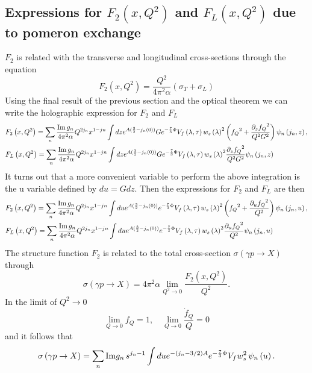 \documentclass[a4paper,12pt]{article}
\begin{document}
\subsection{Expressions for $F_2\left(x, Q^2\right)$ and $F_L\left(x, Q^2\right)$ due to pomeron exchange}
$F_2$ is related with the transverse and longitudinal cross-sections through the equation
\begin{equation}
 F_2\left(x, Q^2\right) = \frac{Q^2}{4 \pi^2 \alpha} \left( \sigma_T + \sigma_L \right)
\end{equation}
Using the final result of the previous section and the optical theorem we can write the holographic expression for $F_2$ and $F_L$
\begin{align}
 &F_2\left(x, Q^2\right) = \sum_n \frac{{\rm Im} \, g_n}{4 \pi^2 \alpha} Q^{2 j_n} x^{1-jn} \int dz e^{A(\frac{3}{2} - {j_n\left(0\right)})} G e^{-\frac{7}{3} \Phi}  V_f \left( \lambda, \tau \right) {w_s\left(\lambda \right)}^2  \left(  {f_Q}^2 + \frac{{\partial_z f_Q}^2}{Q^2 G^2}  \right) \psi_n \left(j_n, z\right), \\
& F_L\left(x, Q^2\right) = \sum_n \frac{{\rm Im} \,g_n}{4 \pi^2 \alpha} Q^{2 j_n} x^{1-jn} \int dz e^{A(\frac{3}{2} - {j_n\left(0\right)})} G e^{-\frac{7}{3} \Phi}  V_f \left( \lambda, \tau \right) {w_s\left(\lambda \right)}^2  \frac{{\partial_z f_Q}^2}{Q^2 G^2} \psi_n \left(j_n, z\right)
\end{align}
It turns out that a more convenient variable to perform the above integration is the u variable defined by $du = G dz$. Then the expressions for $F_2$ and $F_L$ are then
\begin{align}
 &F_2\left(x, Q^2\right) = \sum_n \frac{{\rm Im} \, g_n}{4 \pi^2 \alpha} Q^{2 j_n} x^{1-jn} \int du e^{A(\frac{3}{2} - {j_n\left(0\right)})}  e^{-\frac{7}{3} \Phi}  V_f \left( \lambda, \tau \right) {w_s\left(\lambda \right)}^2  \left(  {f_Q}^2 + \frac{{\partial_u f_Q}^2}{Q^2}  \right) \psi_n \left(j_n, u\right), \\
& F_L\left(x, Q^2\right) = \sum_n \frac{{\rm Im} \, g_n}{4 \pi^2 \alpha} Q^{2 j_n} x^{1-jn} \int du e^{A(\frac{3}{2} - {j_n\left(0\right)})}  e^{-\frac{7}{3} \Phi}  V_f \left( \lambda, \tau \right) {w_s\left(\lambda \right)}^2  \frac{{\partial_u f_Q}^2}{Q^2} \psi_n \left(j_n, u\right)
\end{align}
The structure function $F_2$ is related to the total cross-section $\sigma\left(\gamma p \rightarrow X\right)$ through
\begin{equation}
\sigma\left(\gamma p \rightarrow X\right) = 4 \pi^2 \alpha \lim_{Q^2 \rightarrow 0} \frac{F_2\left(x, Q^2\right)}{Q^2}.
\end{equation}
In the limit of $Q^2 \rightarrow 0$
\begin{equation}
\lim_{Q\rightarrow 0} f_Q = 1 , \quad \lim_{Q\rightarrow 0} \frac{\dot{f}_Q}{Q} = 0
\end{equation}
and it follows that
\begin{equation}
\sigma\left(\gamma p \rightarrow X\right) = \sum_n {\rm Im} g_n \,  s^{j_n - 1} \int du e^{-\left(j_n - 3/2 \right)A } e^{-\frac{7}{3} \Phi} V_f w_s^2  \,  \psi_n\left(u\right).
\end{equation}
\end{document}
